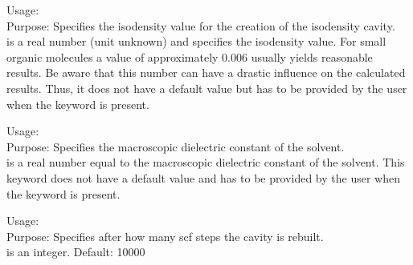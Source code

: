 {
  \noindent
  Usage:   \\[1.0ex] 
  Purpose: Specifies the isodensity value for the creation of the isodensity cavity. \\[1.0ex]
   is a real number (unit unknown) and specifies the isodensity value. For small organic molecules a value of approximately $0.006$ usually yields reasonable results. Be aware that this number can have a drastic influence on the calculated results. Thus, it does not have a default value but has to be provided by the user when the keyword  is present. \\
}

{
  \noindent
  Usage:   \\[1.0ex] 
  Purpose: Specifies the macroscopic dielectric constant of the solvent. \\[1.0ex]
   is a real number equal to the macroscopic dielectric constant of the solvent. This keyword does not have a default value and has to be provided by the user when the keyword  is present. \\
}

{
  \noindent
  Usage:   \\[1.0ex] 
  Purpose: Specifies after how many scf steps the cavity is rebuilt. \\[1.0ex]
   is an integer. Default: 10000 \\
}

